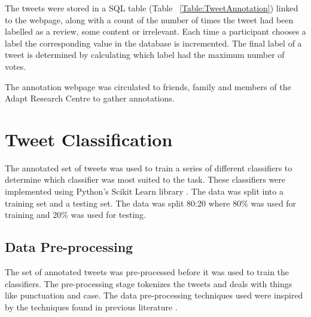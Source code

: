 The tweets were stored in a SQL table (Table ~\ref{Table:TweetAnnotation}) linked to the webpage, along with a count of the number of times the tweet had been labelled as a review, some content or irrelevant. Each time a participant chooses a label the corresponding value in the database is incremented. The final label of a tweet is determined by calculating which label had the maximum number of votes. 

The annotation webpage was circulated to friends, family and members of the Adapt Research Centre to gather annotations.

\section{Tweet Classification}

The annotated set of tweets was used to train a series of different classifiers to determine which classifier was most suited to the task. These classifiers were implemented using Python's Scikit Learn library \cite{scikit-learn}. The data was split into a training set and a testing set. The data was split 80:20 where 80\% was used for training and 20\% was used for testing.

\subsection{Data Pre-processing}

The set of annotated tweets was pre-processed before it was used to train the classifiers. The pre-processing stage tokenizes the tweets and deals with things like punctuation and case. The data pre-processing techniques used were inspired by the techniques found in previous literature \cite{Ankit2018,Rane2018,Go2009,Raithi2018}. 

